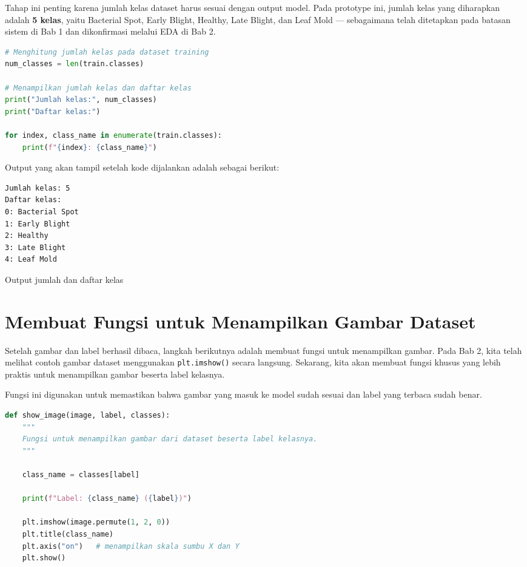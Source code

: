 Tahap ini penting karena jumlah kelas dataset harus sesuai dengan output model. Pada prototype ini, jumlah kelas yang diharapkan adalah \textbf{5 kelas}, yaitu Bacterial Spot, Early Blight, Healthy, Late Blight, dan Leaf Mold --- sebagaimana telah ditetapkan pada batasan sistem di Bab 1 dan dikonfirmasi melalui EDA di Bab 2.

\begin{lstlisting}[language=Python, caption=Mengecek jumlah kelas dataset]
# Menghitung jumlah kelas pada dataset training
num_classes = len(train.classes)

# Menampilkan jumlah kelas dan daftar kelas
print("Jumlah kelas:", num_classes)
print("Daftar kelas:")

for index, class_name in enumerate(train.classes):
    print(f"{index}: {class_name}")
\end{lstlisting}

Output yang akan tampil setelah kode dijalankan adalah sebagai berikut:

\begin{outputcode}[H]
\begin{lstlisting}[language={}]
Jumlah kelas: 5
Daftar kelas:
0: Bacterial Spot
1: Early Blight
2: Healthy
3: Late Blight
4: Leaf Mold
\end{lstlisting}
\caption{Output jumlah dan daftar kelas}
\end{outputcode}

\section{Membuat Fungsi untuk Menampilkan Gambar Dataset}

Setelah gambar dan label berhasil dibaca, langkah berikutnya adalah membuat fungsi untuk menampilkan gambar. Pada Bab 2, kita telah melihat contoh gambar dataset menggunakan \texttt{plt.imshow()} secara langsung. Sekarang, kita akan membuat fungsi khusus yang lebih praktis untuk menampilkan gambar beserta label kelasnya.

Fungsi ini digunakan untuk memastikan bahwa gambar yang masuk ke model sudah sesuai dan label yang terbaca sudah benar.

\begin{lstlisting}[language=Python, caption=Membuat fungsi untuk menampilkan gambar]
def show_image(image, label, classes):
    """
    Fungsi untuk menampilkan gambar dari dataset beserta label kelasnya.
    """

    class_name = classes[label]

    print(f"Label: {class_name} ({label})")

    plt.imshow(image.permute(1, 2, 0))
    plt.title(class_name)
    plt.axis("on")   # menampilkan skala sumbu X dan Y
    plt.show()
\end{lstlisting}

